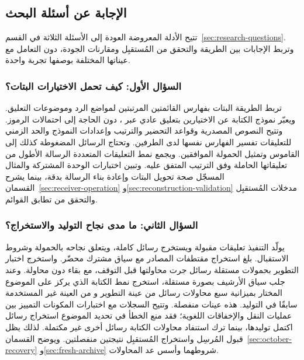 \subsection{الإجابة عن أسئلة البحث}
\label{sec:research-answers}

تتيح الأدلة المعروضة العودة إلى الأسئلة الثلاثة في القسم~\ref{sec:research-questions}. وتربط الإجابات بين الطريقة والتحقق من المُستقبِل ومقارنات الجودة، دون التعامل مع عيناتها المختلفة بوصفها تجربة واحدة.

\subsubsection{السؤال الأول: كيف تحمل الاختيارات البتات؟}
تربط الطريقة البتات بفهارس القائمتين المرتبتين لمواضع الرد وموضوعات التعليق. ويعبّر نموذج الكتابة عن الاختيارين بتعليق عادي عبر ، دون الحاجة إلى احتمالات الرموز. وتتيح النصوص المصدرية وقواعد التحضير والترتيب وإعدادات النموذج والحد الزمني للتعليقات تفسير الفهارس نفسها لدى الطرفين. وتحتاج الرسائل المضغوطة كذلك إلى القاموس وتمثيل الحمولة الموافقين. ويجمع نمط التعليقات المتعددة الرسالة الأطول من تعليقاتها الحاملة وفق الترتيب المتفق عليه. وتبين اختبارات الوحدة المشتركة والمثال المسجّل صحة تحويل البتات وإعادة بناء الرسالة بدقة، بينما يشرح القسمان~\ref{sec:receiver-operation} و\ref{sec:reconstruction-validation} مدخلات المُستقبِل والتحقق من تطابق القوائم.

\subsubsection{السؤال الثاني: ما مدى نجاح التوليد والاستخراج؟}
يولّد التنفيذ تعليقات مقبولة ويستخرج رسائل كاملة، ويتعلق نجاحه بالحمولة وشروط الاستقبال. بلغ استخراج مقتطفات المصادر \NUM{\OctExact/\OctAttempts} مع سياق مشترك محضّر. واستخرج اختبار التطوير بحمولات مستقلة \NUM{\DevExact/\DevAttempted} رسائل جرت محاولتها قبل التوقف، مع بقاء \NUM{\DevUnattempted} دون محاولة. وعند جلب سياق الأرشيف بصورة مستقلة، استخرج نمط الكتابة الذي يركز على الموضوع المختار بميزانية سبع محاولات \NUM{\FreshDevSevenExact/\FreshAssigned} رسائل من عينة التطوير و\NUM{\FreshHeldSevenExact/\FreshAssigned} من العينة غير المستخدمة سابقًا في التوليد. هذه عينات منفصلة. وتتيح السجلات مع اختبارات المكونات التمييز بين عمليات النقل والإخفاقات اللغوية؛ فقد منع الخطأ في تحديد الموضوع استخراج رسائل اكتمل توليدها، بينما ترك استنفاد محاولات الكتابة رسائل أخرى غير مكتملة. لذلك يظل قبول المُرسِل واستخراج المُستقبِل نتيجتين منفصلتين. ويوضح القسمان~\ref{sec:october-recovery} و\ref{sec:fresh-archive} شروطهما وأسس عد المحاولات.

